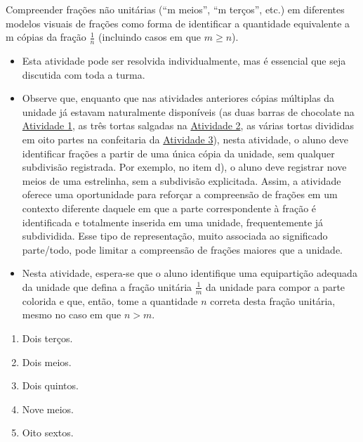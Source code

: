 \begin{atividade}\label{chap2-ativ5}
\objetivos
  Compreender frações não unitárias (``m meios'', ``m terços'', etc.) em diferentes modelos visuais de frações como forma de identificar a quantidade equivalente a m cópias da fração $\frac{1}{n}$ (incluindo casos em que $m \geq n$).

\discussoes
  \begin{itemize} %
    \item       Esta atividade pode ser resolvida individualmente, mas é essencial que seja discutida com toda a turma.
    \item       Observe que, enquanto que nas atividades anteriores cópias múltiplas da unidade já estavam naturalmente disponíveis (as duas barras de chocolate na \hyperref[chap2-ativ1]{Atividade 1}, as três tortas salgadas na \hyperref[chap2-ativ2]{Atividade 2}, as várias tortas divididas em oito partes na confeitaria da \hyperref[chap2-ativ3]{Atividade 3}), nesta atividade, o aluno deve identificar frações a partir de uma única cópia da unidade, sem qualquer subdivisão registrada. Por exemplo, no item d), o aluno deve registrar nove meios de uma estrelinha, sem a subdivisão explicitada. Assim, a atividade oferece uma oportunidade para reforçar a compreensão de frações em um contexto diferente daquele em que a parte correspondente à fração é identificada e totalmente inserida em uma unidade, frequentemente já subdividida. Esse tipo de representação, muito associada ao significado parte/todo, pode limitar a compreensão de frações maiores que a unidade.
    \item       Nesta atividade, espera-se que o aluno identifique uma equipartição adequada da unidade que defina a fração unitária       $\frac{1}{m}$ da unidade para compor a parte colorida e que, então, tome a quantidade       $n$ correta desta fração unitária, mesmo no caso em que       $n > m$.
\end{itemize} %

\solucao
\begin{enumerate}
   \item Dois terços.
   \item Dois meios.
   \item Dois quintos.
   \item Nove meios.
   \item Oito sextos.
\end{enumerate}

\end{atividade}
\clearpage


